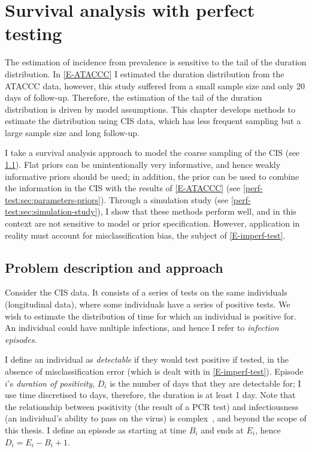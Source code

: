 \documentclass[thesis.tex]{subfiles}
\begin{document}
\chapter{Survival analysis with perfect testing} \label{perf-test}

The estimation of incidence from prevalence is sensitive to the tail of the duration distribution.
In \cref{E-ATACCC} I estimated the duration distribution from the ATACCC data, however, this study suffered from a small sample size and only 20 days of follow-up.
Therefore, the estimation of the tail of the duration distribution is driven by model assumptions.
This chapter develops methods to estimate the distribution using CIS data, which has less frequent sampling but a large sample size and long follow-up.

I take a survival analysis approach to model the coarse sampling of the CIS (see \cref{perf-test:sec:problem}).
Flat priors can be unintentionally very informative, and hence weakly informative priors should be used; in addition, the prior can be used to combine the information in the CIS with the results of \cref{E-ATACCC} (see \cref{perf-test:sec:parameters-priors}).
Through a simulation study (see \cref{perf-test:sec:simulation-study}), I show that these methods perform well, and in this context are not sensitive to model or prior specification.
However, application in reality must account for misclassification bias, the subject of \cref{E-imperf-test}.


\section{Problem description and approach} \label{perf-test:sec:problem}

Consider the CIS data.
It consists of a series of tests on the same individuals (longitudinal data), where some individuals have a series of positive tests.
We wish to estimate the distribution of time for which an individual is positive for.
An individual could have multiple infections, and hence I refer to \emph{infection episodes}.

I define an individual as \emph{detectable} if they would test positive if tested, in the absence of misclassification error (which is dealt with in \cref{E-imperf-test}).
Episode $i$'s \emph{duration of positivity}, $D_i$ is the number of days that they are detectable for; I use time discretised to days, therefore, the duration is at least 1 day.
Note that the relationship between positivity (\ie the result of a PCR test) and infectiousness (\ie an individual's ability to pass on the virus) is complex~\autocites{lascolaViral}{singanayagamDuration}, and beyond the scope of this thesis.
I define an episode as starting at time $B_i$ and ends at $E_i$, hence $D_i = E_i - B_i + 1$.
\end{document}
